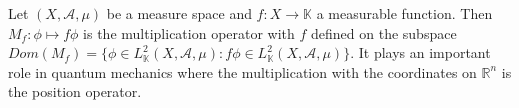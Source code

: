 \documentclass[12pt]{article}
\begin{document}
Let $(X,\mathcal{A},\mu)$ be a measure space and $f \colon X \to \mathbb{K}$ a measurable function. Then $M_f \colon \phi \mapsto f \phi$ is the multiplication operator with $f$ defined on the subspace $Dom(M_f)=\{\phi \in L^2_\mathbb{K}(X,\mathcal{A},\mu) \colon f \phi \in L^2_\mathbb{K}(X,\mathcal{A},\mu)\}$. It plays an important role in quantum mechanics where the multiplication with the coordinates on $\mathbb{R}^n$ is the position operator.
\end{document}
